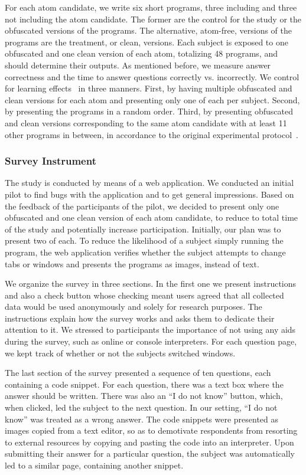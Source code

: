 For each atom candidate, we write six short programs, three including and three not including the atom candidate. The former are the control for the study or the obfuscated versions of the programs. The alternative, atom-free, versions of the programs are the treatment, or clean, versions. Each subject is exposed to one obfuscated and one clean version of each atom, totalizing 48 programs, and should determine their outputs. As mentioned before, we measure answer correctness and the time to answer questions correctly vs. incorrectly. We control for learning effects~\cite{Neely:1991:SPE} in three manners. First, by having multiple obfuscated and clean versions for each atom and presenting only one of each per subject. Second, by presenting the programs in a random order. Third, by presenting obfuscated and clean versions corresponding to the same atom candidate with at least 11 other programs in between, in  accordance to the original experimental protocol~\cite{GopsteinIYDZYC17}. 

\subsubsection*{Survey Instrument} 

The study is conducted by means of a web application. We conducted an initial pilot to find bugs with the application and to get general impressions. Based on the feedback of the participants of the pilot, we decided to present only one obfuscated and one clean version of each atom candidate, to reduce to total time of the study and potentially increase participation. Initially, our plan was to present two of each. 
To reduce the likelihood of a subject simply running the program, the web application verifies whether the subject attempts to change tabs or windows and presents the programs as images, instead of text. 

We organize the survey in three sections. In the first one we present instructions and also a check button whose checking meant users agreed that all collected data would be used anonymously and solely for research purposes. The instructions explain how the survey works and asks them to dedicate their attention to it.  We stressed to participants the importance of not using any aids during the survey, such as online or console interpreters. For each question page, we kept track of whether or not the subjects switched windows. 

The last section of the survey presented a sequence of ten questions, each containing a code snippet. For each question, there was a text box where the answer should be written. There was also an ``I do not know'' button, which, when clicked, led the subject to the next question. In our setting, ``I do not know'' was treated as a wrong answer. The code snippets were presented as images copied from a text editor, so as to demotivate respondents from resorting to external resources by copying and pasting the code into an interpreter. Upon submitting their answer for a particular question, the subject was automatically led to a similar page, containing another snippet.


